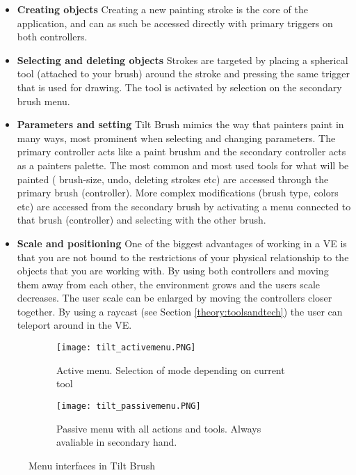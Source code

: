  \begin{itemize}
\item \textbf{Creating objects}
Creating a new painting stroke is the core of the application, and can as such be accessed directly with primary triggers on both controllers.
\item \textbf{Selecting and deleting objects}
Strokes are targeted by placing a spherical tool (attached to your brush) around the stroke and pressing the same trigger that is used for drawing. The tool is activated by selection on the secondary brush menu.
\item \textbf{Parameters and setting}
Tilt Brush mimics the way that painters paint in many ways, most prominent when selecting and changing parameters. The primary controller acts like a paint brushm and the secondary controller acts as a painters palette. The most common and most used tools for what will be painted ( brush-size, undo, deleting strokes etc) are accessed through the primary brush (controller). More complex modifications (brush type, colors etc) are accessed from the secondary brush by activating a menu connected to that brush (controller) and selecting with the other brush.
\item \textbf{Scale and positioning}
One of the biggest advantages of working in a VE is that you are not bound to the restrictions of your physical relationship to the objects that you are working with. By using both controllers and moving them away from each other, the environment grows and the users scale decreases. The user scale can be enlarged by moving the controllers closer together.
By using a raycast (see Section \ref{theory:toolsandtech}) the user can teleport around in the VE.
 \end{itemize}
 \begin{figure}
 \begin{subfigure}{.5\textwidth}
   \centering
   \texttt{[image: tilt\_activemenu.PNG]}
   \caption{Active menu. Selection of mode depending on current tool}
   \label{fig:tilt:activemenu}
 \end{subfigure}%
 \begin{subfigure}{.5\textwidth}
   \centering
   \texttt{[image: tilt\_passivemenu.PNG]}
   \caption{Passive menu with all actions and tools. Always avaliable in secondary hand. }
   \label{fig:tilt:passivemenu}
 \end{subfigure}
 \caption{Menu interfaces in Tilt Brush}
 \label{fig:tilt}
 \end{figure}
